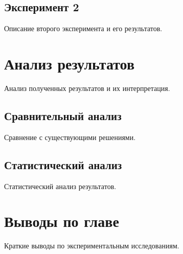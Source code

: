 \subsection{Эксперимент 2}

Описание второго эксперимента и его результатов.

\section{Анализ результатов}

Анализ полученных результатов и их интерпретация.

\subsection{Сравнительный анализ}

Сравнение с существующими решениями.

\subsection{Статистический анализ}

Статистический анализ результатов.

\section{Выводы по главе}

Краткие выводы по экспериментальным исследованиям.
